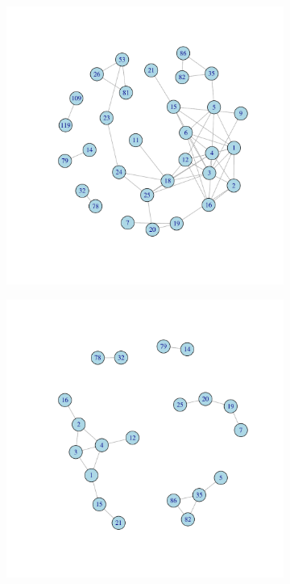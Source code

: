 \documentclass[11pt, oneside]{article}   	%
\begin{document}
\begin{figure}[H]
	\centering
	\begin{subfigure}[t]{0.48\textwidth}
	 \centering
	 \includegraphics[width=\linewidth]{ikc10_k_pw.pdf} 
	 \end{subfigure}
 \hfill
	\begin{subfigure}[t]{0.48\textwidth}
        \centering
        \includegraphics[width=\linewidth]{ikc10_m_pw.pdf} 

\end{subfigure}
\end{figure}
\end{document}
